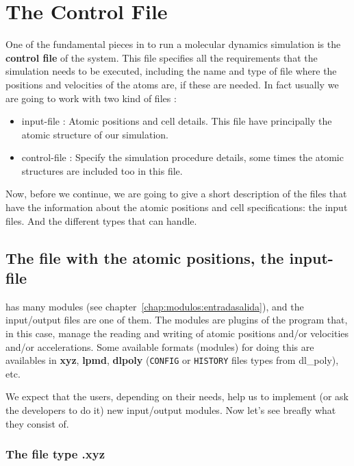 \chapter{The Control File} %
\label{chap:input}

One of the fundamental pieces in {\lpmd} to run a molecular dynamics simulation
is the \textbf{control file} of the system. This file specifies all the
requirements that the simulation needs to be executed, including the name and
type of file where the positions and velocities of the atoms are, if these are
needed. In fact usually we are going to work with two kind of files :

\begin{itemize}
 \item input-file : Atomic positions and cell details. This file have
principally the atomic structure of our simulation.
 \item control-file : Specify the simulation procedure details, some times the
atomic structures are included too in this file.
\end{itemize}


Now, before we continue, we are going to give a short description of the
files that have the information about the atomic positions and cell
specifications: the input files. And the different types that {\lpmd} can
handle.

\section{The file with the atomic positions, the input-file}

{\lpmd} has many modules (see chapter~\ref{chap:modulos:entradasalida}), and the
 input/output files are one of them. The modules are plugins of the program
that, in this case, manage the reading and writing of atomic positions and/or
velocities and/or accelerations. Some available formats (modules) for doing this
are availables in {\lpmd} \textbf{xyz}, \textbf{lpmd}, \textbf{dlpoly}
(\verb|CONFIG| or \verb|HISTORY| files types from dl\_poly), etc.

We expect that the users, depending on their needs, help us to implement (or
ask the developers to do it) new input/output modules. Now let's see breafly
what they consist of.

\subsection{The file type .xyz}
\label{subsec:xyz}

